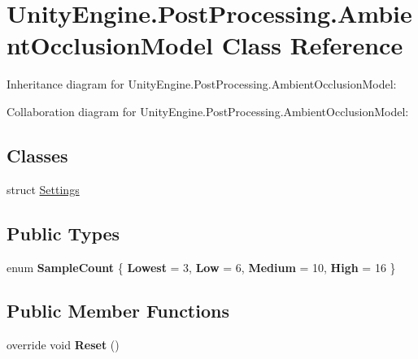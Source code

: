 \hypertarget{class_unity_engine_1_1_post_processing_1_1_ambient_occlusion_model}{}\section{Unity\+Engine.\+Post\+Processing.\+Ambient\+Occlusion\+Model Class Reference}
\label{class_unity_engine_1_1_post_processing_1_1_ambient_occlusion_model}


Inheritance diagram for Unity\+Engine.\+Post\+Processing.\+Ambient\+Occlusion\+Model\+:


Collaboration diagram for Unity\+Engine.\+Post\+Processing.\+Ambient\+Occlusion\+Model\+:
\subsection*{Classes}
\begin{DoxyCompactItemize}
\item 
struct \hyperlink{struct_unity_engine_1_1_post_processing_1_1_ambient_occlusion_model_1_1_settings}{Settings}
\end{DoxyCompactItemize}
\subsection*{Public Types}
\begin{DoxyCompactItemize}
\item 
\mbox{\label{class_unity_engine_1_1_post_processing_1_1_ambient_occlusion_model_abdde0f4c8184e60edc0466c88c55140f}} 
enum {\bfseries Sample\+Count} \{ {\bfseries Lowest} = 3, 
{\bfseries Low} = 6, 
{\bfseries Medium} = 10, 
{\bfseries High} = 16
 \}
\end{DoxyCompactItemize}
\subsection*{Public Member Functions}
\begin{DoxyCompactItemize}
\item 
\mbox{\label{class_unity_engine_1_1_post_processing_1_1_ambient_occlusion_model_acd50412ffa1f482d1d7561c48cc7f731}} 
override void {\bfseries Reset} ()
\end{DoxyCompactItemize}
